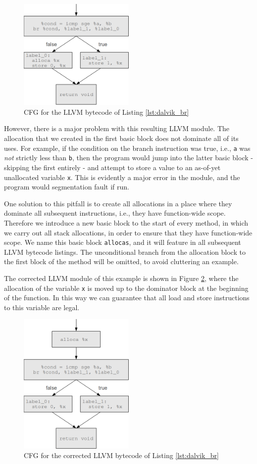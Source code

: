 \begin{figure}[h!]
    \centering
    \includegraphics[width=0.5\textwidth]{images/cfg_llvm.png}
    \caption{CFG for the LLVM bytecode of Listing \ref{lst:dalvik_br}}
    \label{fig:cfg_llvm}
\end{figure}

However, there is a major problem with this resulting LLVM module. The allocation that we created in the first basic block does not dominate all of its uses. For example, if the condition on the branch instruction was true, i.e., \verb|a| was \textit{not} strictly less than \verb|b|, then the program would jump into the latter basic block - skipping the first entirely - and attempt to store a value to an as-of-yet unallocated variable \verb|x|. This is evidently a major error in the module, and the program would segmentation fault if run.

One solution to this pitfall is to create all allocations in a place where they dominate all subsequent instructions, i.e., they have function-wide scope. Therefore we introduce a new basic block to the start of every method, in which we carry out all stack allocations, in order to ensure that they have function-wide scope. We name this basic block \verb|allocas|, and it will feature in all subsequent LLVM bytecode listings. The unconditional branch from the allocation block to the first block of the method will be omitted, to avoid cluttering an example.

The corrected LLVM module of this example is shown in Figure \ref{fig:cfg_llvm2}, where the allocation of the variable \verb|x| is moved up to the dominator block at the beginning of the function. In this way we can guarantee that all load and store instructions to this variable are legal.


\begin{figure}[h!]
    \centering
    \includegraphics[width=0.5\textwidth]{images/cfg_llvm2.png}
    \caption{CFG for the corrected LLVM bytecode of Listing \ref{lst:dalvik_br}}
    \label{fig:cfg_llvm2}
\end{figure}

